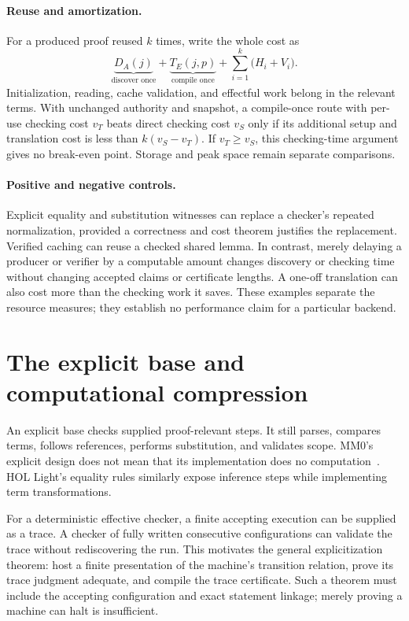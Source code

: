 \documentclass[11pt]{article}
\begin{document}
\paragraph{Reuse and amortization.}
For a produced proof reused $k$ times, write the whole cost as
\[
 \underbrace{D_A(j)}_{\text{discover once}}+
 \underbrace{T_E(j,p)}_{\text{compile once}}+
 \sum_{i=1}^{k}\bigl(H_i+V_i\bigr).
\]
Initialization, reading, cache validation, and effectful work belong in
the relevant terms. With unchanged authority and snapshot, a compile-once
route with per-use checking cost $v_T$ beats direct checking cost $v_S$
only if its additional setup and translation cost is less than
$k(v_S-v_T)$. If $v_T\ge v_S$, this checking-time argument gives no
break-even point. Storage and peak space remain separate comparisons.

\paragraph{Positive and negative controls.}
Explicit equality and substitution witnesses can replace a checker's
repeated normalization, provided a correctness and cost theorem justifies
the replacement. Verified caching can reuse a checked shared lemma.
In contrast, merely delaying a producer or verifier by a computable
amount changes discovery or checking time without changing accepted
claims or certificate lengths. A one-off translation can also cost more
than the checking work it saves. These examples separate the resource
measures; they establish no performance claim for a particular backend.

\section{The explicit base and computational compression}
An explicit base checks supplied proof-relevant steps. It still parses,
compares terms, follows references, performs substitution, and validates
scope. MM0's explicit design does not mean that its implementation does
no computation~\cite{mm0}. HOL Light's equality rules similarly expose
inference steps while implementing term transformations.

For a deterministic effective checker, a finite accepting execution can
be supplied as a trace. A checker of fully written consecutive
configurations can validate the trace without rediscovering the run.
This motivates the general explicitization theorem: host a finite
presentation of the machine's transition relation, prove its trace
judgment adequate, and compile the trace certificate. Such a theorem
must include the accepting configuration and exact statement linkage;
merely proving a machine can halt is insufficient.
\end{document}
